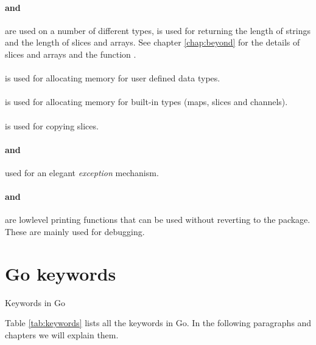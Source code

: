 \paragraph{ and } are used on a number of different
types,  is
used for returning the length of strings and the length of slices and
arrays. See chapter \ref{chap:beyond} for the details of slices and
arrays and the function .

\paragraph{} is used for allocating memory for user defined
data types.

\paragraph{} is used for allocating memory for built-in
types (maps, slices and channels).

\paragraph{} is used for copying slices. 

\paragraph{ and } used for an elegant \emph{exception} mechanism.

\paragraph{ and } are lowlevel printing
functions that can be used without reverting to the 
package. These are mainly used for debugging.

\section{Go keywords}
\begin{table}[H]
\begin{center}
\caption{Keywords in Go}
\label{tab:keywords}

\end{center}
\end{table}
Table \ref{tab:keywords} lists all the keywords in Go.
In the following paragraphs and chapters we will explain them. 

